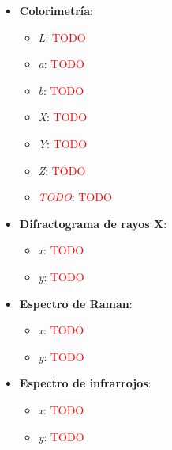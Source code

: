 \begin{itemize}
    \item \textbf{Colorimetría}:
        \begin{itemize}
            \item \textit{L}: \textcolor{red}{TODO}
            \item \textit{a}: \textcolor{red}{TODO}
            \item \textit{b}: \textcolor{red}{TODO}
            \item \textit{X}: \textcolor{red}{TODO}
            \item \textit{Y}: \textcolor{red}{TODO}
            \item \textit{Z}: \textcolor{red}{TODO}
            \item \textit{\textcolor{red}{TODO}}: \textcolor{red}{TODO}
        \end{itemize}
        
    \item \textbf{Difractograma de rayos X}:
        \begin{itemize}
            \item \textit{x}: \textcolor{red}{TODO}
            \item \textit{y}: \textcolor{red}{TODO}
        \end{itemize}
        
    \item \textbf{Espectro de Raman}:
        \begin{itemize}
            \item \textit{x}: \textcolor{red}{TODO}
            \item \textit{y}: \textcolor{red}{TODO}
        \end{itemize}
        
    \item \textbf{Espectro de infrarrojos}:
        \begin{itemize}
            \item \textit{x}: \textcolor{red}{TODO}
            \item \textit{y}: \textcolor{red}{TODO}
        \end{itemize}
        

\end{itemize}

